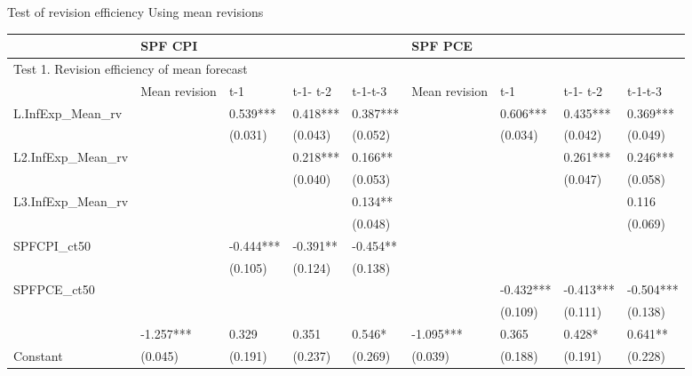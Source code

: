 \documentclass{beamer}
\begin{document}
\begin{frame}{Test of revision efficiency Using mean revisions}

	\begin{adjustbox}{width=0.9\textwidth}
	\begin{threeparttable}
		\label{RevEfficiency}
		\begin{tabular}{lllllllll}
			\hline 
			& \multicolumn{4}{l}{SPF CPI}                     & \multicolumn{4}{l}{SPF PCE}                       \\
			\hline 
			\multicolumn{9}{l}{Test 1.  Revision efficiency of mean forecast}            \\
			\hline 
			& Mean revision & t-1       & t-1- t-2 & t-1-t-3  & Mean revision & t-1       & t-1- t-2  & t-1-t-3   \\
			\hline 
			L.InfExp\_Mean\_rv  &               & 0.539***  & 0.418*** & 0.387*** &               & 0.606***  & 0.435***  & 0.369***  \\
			&               & (0.031)   & (0.043)  & (0.052)  &               & (0.034)   & (0.042)   & (0.049)   \\
			L2.InfExp\_Mean\_rv &               &           & 0.218*** & 0.166**  &               &           & 0.261***  & 0.246***  \\
			&               &           & (0.040)  & (0.053)  &               &           & (0.047)   & (0.058)   \\
			L3.InfExp\_Mean\_rv &               &           &          & 0.134**  &               &           &           & 0.116     \\
			&               &           &          & (0.048)  &               &           &           & (0.069)   \\
			SPFCPI\_ct50        &               & -0.444*** & -0.391** & -0.454** &               &           &           &           \\
			&               & (0.105)   & (0.124)  & (0.138)  &               &           &           &           \\
			SPFPCE\_ct50        &               &           &          &          &               & -0.432*** & -0.413*** & -0.504*** \\
			&               &           &          &          &               & (0.109)   & (0.111)   & (0.138)   \\
			& -1.257***     & 0.329     & 0.351    & 0.546*   & -1.095***     & 0.365     & 0.428*    & 0.641**   \\
			Constant & (0.045)       & (0.191)   & (0.237)  & (0.269)  & (0.039)       & (0.188)   & (0.191)   & (0.228)   \\

\end{tabular}
\end{threeparttable}
\end{adjustbox}
\end{frame}
\end{document}
